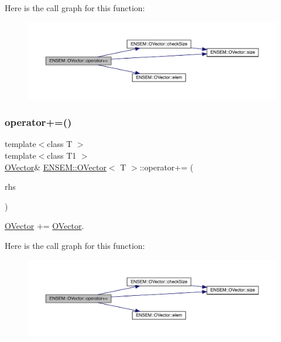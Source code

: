 Here is the call graph for this function\+:
\nopagebreak
\begin{figure}[H]
\begin{center}
\leavevmode
\includegraphics[width=350pt]{d0/d8d/classENSEM_1_1OVector_a5ecd1c4c6a2e7d9a6a3e5189b3a22ba5_cgraph}
\end{center}
\end{figure}
\mbox{\label{classENSEM_1_1OVector_a5ecd1c4c6a2e7d9a6a3e5189b3a22ba5}} 
\subsubsection{\texorpdfstring{operator+=()}{operator+=()}\hspace{0.1cm}{\footnotesize\ttfamily [5/6]}}
{\footnotesize\ttfamily template$<$class T $>$ \\
template$<$class T1 $>$ \\
\mbox{\hyperlink{classENSEM_1_1OVector}{O\+Vector}}\& \mbox{\hyperlink{classENSEM_1_1OVector}{E\+N\+S\+E\+M\+::\+O\+Vector}}$<$ T $>$\+::operator+= (\begin{DoxyParamCaption}\item[{const \mbox{\hyperlink{classENSEM_1_1OVector}{O\+Vector}}$<$ T1 $>$ \&}]{rhs }\end{DoxyParamCaption})\hspace{0.3cm}{\ttfamily [inline]}}



\mbox{\hyperlink{classENSEM_1_1OVector}{O\+Vector}} += \mbox{\hyperlink{classENSEM_1_1OVector}{O\+Vector}}. 

Here is the call graph for this function\+:
\nopagebreak
\begin{figure}[H]
\begin{center}
\leavevmode
\includegraphics[width=350pt]{d0/d8d/classENSEM_1_1OVector_a5ecd1c4c6a2e7d9a6a3e5189b3a22ba5_cgraph}
\end{center}
\end{figure}
\mbox{\label{classENSEM_1_1OVector_a5ecd1c4c6a2e7d9a6a3e5189b3a22ba5}} 

